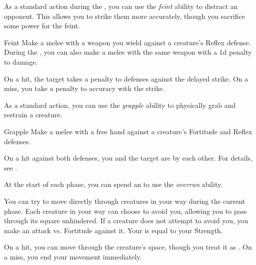          As a standard action during the , you can use the \textit{feint} ability to distract an opponent.
        This allows you to strike them more accurately, though you sacrifice some power for the feint.

        \begin{freeability}{Feint}\label{Feint}
            Make a melee  with a weapon you wield against a creature's Reflex defense.
            During the , you can also make a melee  with the same weapon with a \minus1d penalty to damage.

            On a hit, the target takes a  penalty to defenses against the delayed strike.
            On a miss, you take a  penalty to accuracy with the strike.
        \end{freeability}

         As a standard action, you can use the \textit{grapple} ability to physically grab and restrain a creature.

        \begin{freeability}{Grapple}\label{Grapple}
            Make a melee  with a free hand against a creature's Fortitude and Reflex defenses.

            On a hit against both defenses, you and the target are \grappled by each other.
            For details, see .
        \end{freeability}

         At the start of each phase, you can spend an  to use the \textit{overrun} ability.

        \begin{freeability}{}
            You can try to move directly through creatures in your way during the current phase.
            Each creature in your way can choose to avoid you, allowing you to pass through its square unhindered.
            If a creature does not attempt to avoid you, you make an attack vs. Fortitude against it.
            Your  is equal to your Strength.

            On a hit, you can move through the creature's space, though you treat it as .
            On a miss, you end your movement immediately.
        \end{freeability}

